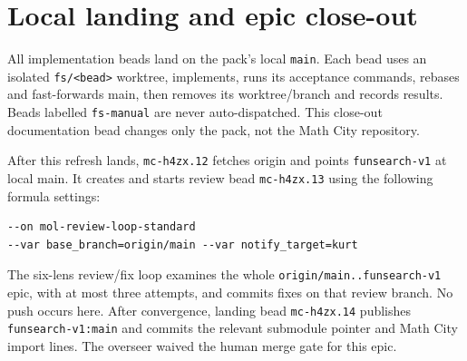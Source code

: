 \documentclass[11pt]{article}
\newcommand{\code}[1]{\texttt{#1}}
\begin{document}
\section{Local landing and epic close-out}
All implementation beads land on the pack's local \code{main}. Each bead uses
an isolated \code{fs/<bead>} worktree, implements, runs its acceptance commands,
rebases and fast-forwards main, then removes its worktree/branch and records
results. Beads labelled \code{fs-manual} are never auto-dispatched. This
close-out documentation bead changes only the pack, not the Math City repository.

After this refresh lands, \code{mc-h4zx.12} fetches origin and points
\code{funsearch-v1} at local main. It creates  and
starts review bead \code{mc-h4zx.13} using the following formula settings:
\begin{lstlisting}
--on mol-review-loop-standard
--var base_branch=origin/main --var notify_target=kurt
\end{lstlisting}
The six-lens review/fix loop examines the whole
\code{origin/main..funsearch-v1} epic,
with at most three attempts, and commits fixes on that review branch. No push
occurs here. After convergence, landing bead \code{mc-h4zx.14} publishes
\code{funsearch-v1:main} and commits the relevant submodule pointer and
Math City import lines. The overseer waived the human merge gate for this epic.
\end{document}
